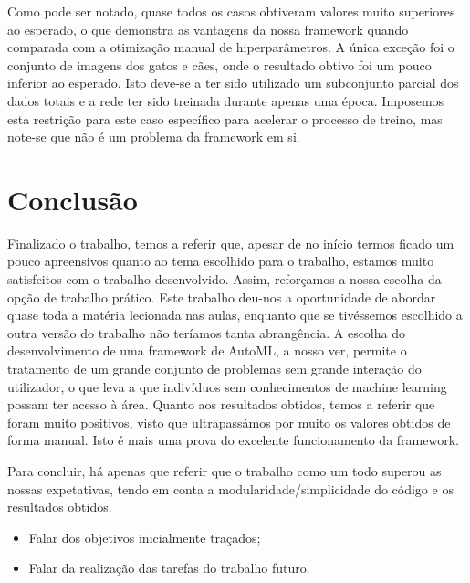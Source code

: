 \documentclass[a4paper]{report}
\begin{document}
{	Como pode ser notado, quase todos os casos obtiveram valores muito superiores ao esperado, o que demonstra as vantagens da nossa framework quando comparada com a otimização manual de hiperparâmetros.
	A única exceção foi o conjunto de imagens dos gatos e cães, onde o resultado obtivo foi um pouco inferior ao esperado. Isto deve-se a ter sido utilizado um subconjunto parcial dos dados totais e a rede ter sido treinada durante apenas uma época. Imposemos esta restrição para este caso específico para acelerar o processo de treino, mas note-se que não é um problema da framework em si.
}

\chapter{Conclusão} \label{ch:Conclusion}
\large{
	Finalizado o trabalho, temos a referir que, apesar de no início termos ficado um pouco apreensivos quanto ao tema escolhido para o trabalho, estamos muito satisfeitos com o trabalho desenvolvido. Assim, reforçamos a nossa escolha da opção de trabalho prático.
	Este trabalho deu-nos a oportunidade de abordar quase toda a matéria lecionada nas aulas, enquanto que se tivéssemos escolhido a outra versão do trabalho não teríamos tanta abrangência.
	A escolha do desenvolvimento de uma framework de AutoML, a nosso ver, permite o tratamento de um grande conjunto de problemas sem grande interação do utilizador, o que leva a que indivíduos sem conhecimentos de machine learning possam ter acesso à área.
	Quanto aos resultados obtidos, temos a referir que foram muito positivos, visto que ultrapassámos por muito os valores obtidos de forma manual. Isto é mais uma prova do excelente funcionamento da framework.
	
	Para concluir, há apenas que referir que o trabalho como um todo superou as nossas expetativas, tendo em conta a modularidade/simplicidade do código e os resultados obtidos.
	\begin{itemize}
		\item Falar dos objetivos inicialmente traçados;
		\item Falar da realização das tarefas do trabalho futuro.
	\end{itemize}
}

\appendix
\end{document}
